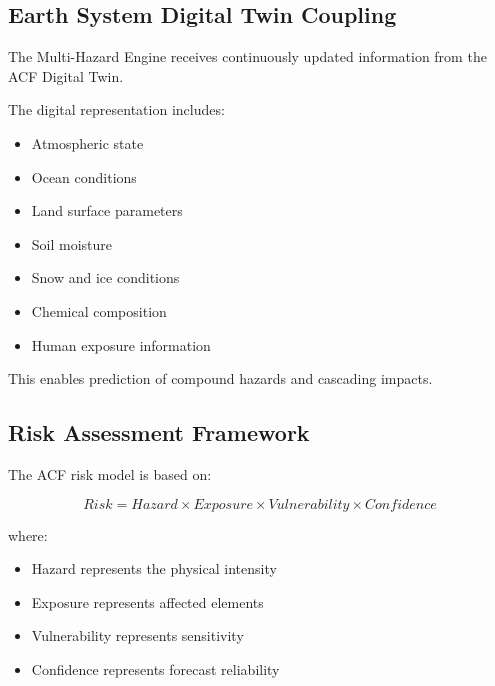 \subsection{Earth System Digital Twin Coupling}

The Multi-Hazard Engine receives continuously updated information from
the ACF Digital Twin.

The digital representation includes:

\begin{itemize}

\item Atmospheric state

\item Ocean conditions

\item Land surface parameters

\item Soil moisture

\item Snow and ice conditions

\item Chemical composition

\item Human exposure information

\end{itemize}

This enables prediction of compound hazards and cascading impacts.


\subsection{Risk Assessment Framework}

The ACF risk model is based on:

\[
Risk =
Hazard
\times
Exposure
\times
Vulnerability
\times
Confidence
\]

where:

\begin{itemize}

\item Hazard represents the physical intensity

\item Exposure represents affected elements

\item Vulnerability represents sensitivity

\item Confidence represents forecast reliability

\end{itemize}

